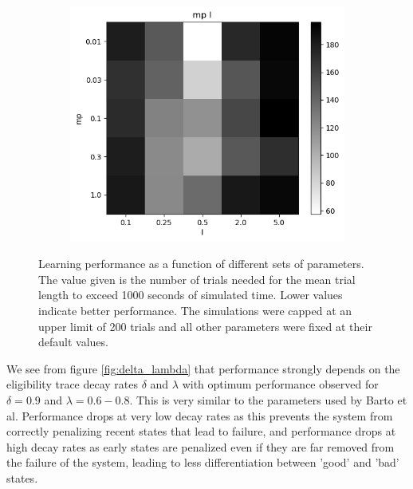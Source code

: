 \documentclass{article}
\begin{document}
\begin{figure}[h]
\begin{subfigure}[t]{0.28\linewidth}
		\label{fig:alpha_beta}	
	\end{subfigure}
	\hspace{0.05\linewidth}
	\begin{subfigure}[t]{0.28\linewidth}
		\centering
		\includegraphics[width = 1.0\linewidth, trim={0 0 0 20}, clip=true]{figures/test_mp_l_heat.png}
		\label{fig:mp_l}	
	\end{subfigure}
\caption{Learning performance as a function of different sets of parameters. The value given is the number of trials needed for the mean trial length to exceed 1000 seconds of simulated time. Lower values indicate better performance. The simulations were capped at an upper limit of 200 trials and all other parameters were fixed at their default values.}
\label{fig:params}
\end{figure}

We see from figure \ref{fig:delta_lambda} that performance strongly depends on the eligibility trace decay rates $\delta$ and $\lambda$ with optimum performance observed for $\delta = 0.9$ and $\lambda = 0.6-0.8$. This is very similar to the parameters used by Barto et al. Performance drops at very low decay rates as this prevents the system from correctly penalizing recent states that lead to failure, and performance drops at high decay rates as early states are penalized even if they are far removed from the failure of the system, leading to less differentiation between 'good' and 'bad' states.
\end{document}
